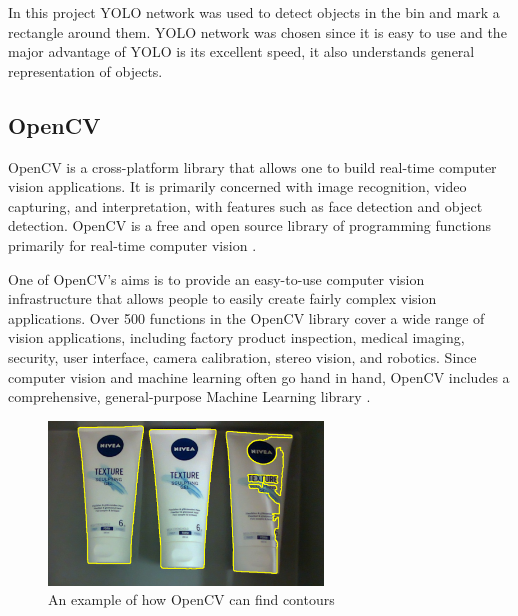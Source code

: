 In this project YOLO network was used to detect objects in the bin and mark a rectangle around them. 
YOLO network was chosen since it is easy to use and the major advantage of YOLO is its excellent speed, it also understands general representation of objects. 



\subsection{OpenCV}
OpenCV is a cross-platform library that allows one to build real-time computer vision applications. It is primarily concerned with image recognition, video capturing, and interpretation, with features such as face detection and object detection. OpenCV is a free and open source library of programming functions primarily for real-time computer vision \cite{noauthor_opencv_nodate}.

One of OpenCV's aims is to provide an easy-to-use computer vision infrastructure that allows people to easily create fairly complex vision applications. Over 500 functions in the OpenCV library cover a wide range of vision applications, including factory product inspection, medical imaging, security, user interface, camera calibration, stereo vision, and robotics. Since computer vision and machine learning often go hand in hand, OpenCV includes a comprehensive, general-purpose Machine Learning library \cite{kaehler_what_2016}.

\begin{figure}[h]
    \centering
    \includegraphics[width=0.65\textwidth]{graphics/contour.PNG}
    \caption{An example of how OpenCV can find contours}
    \label{fig:my_label}
\end{figure}

